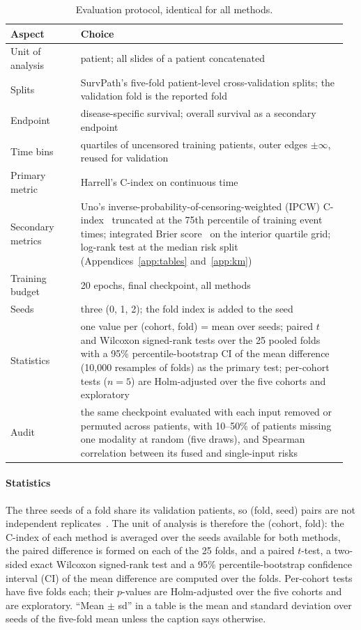 \documentclass{article}
\newcommand{\cindex}{C-index}
\begin{document}
\begin{table}[t]
\caption{Evaluation protocol, identical for all methods.}
\label{tab:protocol}
\centering
\small
\begin{tabular}{@{}p{0.2\linewidth}p{0.76\linewidth}@{}}
\toprule
Aspect & Choice \\
\midrule
Unit of analysis & patient; all slides of a patient concatenated \\
Splits & SurvPath's five-fold patient-level cross-validation splits; the validation fold is the reported fold \\
Endpoint & disease-specific survival; overall survival as a secondary endpoint \\
Time bins & quartiles of uncensored training patients, outer edges $\pm\infty$, reused for validation \\
Primary metric & Harrell's \cindex{} on continuous time~\citep{harrell1982evaluating,polsterl2020scikit} \\
Secondary metrics & Uno's inverse-probability-of-censoring-weighted (IPCW) \cindex{}~\citep{uno2011c} truncated at the 75th percentile of training event times; integrated Brier score~\citep{graf1999assessment} on the interior quartile grid; log-rank test at the median risk split (Appendices~\ref{app:tables} and~\ref{app:km}) \\
Training budget & 20 epochs, final checkpoint, all methods \\
Seeds & three (0, 1, 2); the fold index is added to the seed \\
Statistics & one value per (cohort, fold) = mean over seeds; paired $t$ and Wilcoxon signed-rank tests over the 25 pooled folds with a 95\% percentile-bootstrap CI of the mean difference (10,000 resamples of folds) as the primary test; per-cohort tests ($n = 5$) are Holm-adjusted over the five cohorts and exploratory \\
Audit & the same checkpoint evaluated with each input removed or permuted across patients, with 10--50\% of patients missing one modality at random (five draws), and Spearman correlation between its fused and single-input risks \\
\bottomrule
\end{tabular}
\end{table}

\paragraph{Statistics} The three seeds of a fold share its validation patients, so (fold, seed) pairs are not independent replicates~\citep{nadeau2003inference}. The unit of analysis is therefore the (cohort, fold): the \cindex{} of each method is averaged over the seeds available for both methods, the paired difference is formed on each of the 25 folds, and a paired $t$-test, a two-sided exact Wilcoxon signed-rank test and a 95\% percentile-bootstrap confidence interval (CI) of the mean difference are computed over the folds. Per-cohort tests have five folds each; their $p$-values are Holm-adjusted over the five cohorts and are exploratory. ``Mean $\pm$ sd'' in a table is the mean and standard deviation over seeds of the five-fold mean unless the caption says otherwise.
\end{document}
